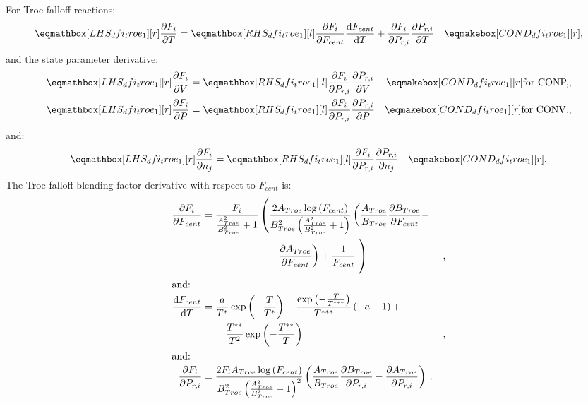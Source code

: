\documentclass[12pt,number,sort&compress]{elsarticle}
\begin{document}
For Troe falloff reactions:
\begin{align}
 \lhs{dfi_troe_1}{\frac{\partial F_{i} }{\partial T }} &= \rhs{dfi_troe_1}{\frac{\partial F_{i} }{\partial F_{cent} } \frac{\text{d} F_{cent} }{\text{d} T } + \frac{\partial F_{i} }{\partial P_{r, i} } \frac{\partial P_{r, i} }{\partial T }} & \cond{dfi_troe_1}{,} \label{e:dfi_troe_dt}
\end{align}
and the state parameter derivative:
\begin{subequations}
 \label{e:dfi_troe_de}
 \begin{align}
 \lhs{dfi_troe_1}{\frac{\partial F_{i} }{\partial V }} &= \rhs{dfi_troe_1}{\frac{\partial F_{i} }{\partial P_{r, i} } \frac{\partial P_{r, i} }{\partial V }} & \cond{dfi_troe_1}{\dconp/,} \\
 \lhs{dfi_troe_1}{\frac{\partial F_{i} }{\partial P }} &= \rhs{dfi_troe_1}{\frac{\partial F_{i} }{\partial P_{r, i} } \frac{\partial P_{r, i} }{\partial P }} & \cond{dfi_troe_1}{\dconv/,}
 \end{align}
\end{subequations}
and:
\begin{align}
 \lhs{dfi_troe_1}{\frac{\partial F_{i} }{\partial n_j}} &= \rhs{dfi_troe_1}{\frac{\partial F_{i} }{\partial P_{r, i} } \frac{\partial P_{r, i} }{\partial n_j }} & \cond{dfi_troe_1}{.} \label{e:dfi_troe_dnj}
\end{align}
The Troe falloff blending factor derivative with respect to $F_{cent}$ is:
\begin{align}
 \frac{\partial F_{i} }{\partial F_{cent} } &= \frac{F_{i}}{\frac{A_{Troe}^{2}}{B_{Troe}^{2}} + 1} \left(\frac{2 A_{Troe} \log{\left (F_{cent} \right )}}{B_{Troe}^{2} \left(\frac{A_{Troe}^{2}}{B_{Troe}^{2}} + 1\right)} \left(\frac{A_{Troe}}{B_{Troe}} \frac{\partial B_{Troe} }{\partial F_{cent} } - \right. \right. & \nonumber \\
 & \mathindent[morespaceplease] \left. \frac{\partial A_{Troe} }{\partial F_{cent} }\right) + \frac{1}{F_{cent}} \left. \vphantom{\frac{F_{i}}{\frac{A_{Troe}^{2}}{B_{Troe}^{2}} + 1}} \right) & \text{,} \label{e:dfi_troe_dfcent_partial} \\
\intertext{and:}
\frac{\text{d} F_{cent} }{\text{d} T } &= \frac{a}{T^{*}} \operatorname{exp}\left({- \frac{T}{T^{*}}}\right) - \frac{\operatorname{exp}\left({- \frac{T}{T^{***}}}\right)}{T^{***}} \left(- a + 1\right) + & \nonumber \\
 & \mathindent \frac{T^{**}}{T^{2}} \operatorname{exp}\left({- \frac{T^{**}}{T}}\right) & \text{,} \label{e:dfcent_dt} \\
\intertext{and:}
\frac{\partial F_{i} }{\partial P_{r, i} } &= \frac{2 F_{i} A_{Troe} \log{\left (F_{cent} \right )}}{B_{Troe}^{2} \left(\frac{A_{Troe}^{2}}{B_{Troe}^{2}} + 1\right)^{2}} \left(\frac{A_{Troe}}{B_{Troe}} \frac{\partial B_{Troe} }{\partial P_{r, i} } - \frac{\partial A_{Troe} }{\partial P_{r, i} }\right) \;. \label{e:dfi_troe_dpr_partial}
\end{align}
\end{document}
